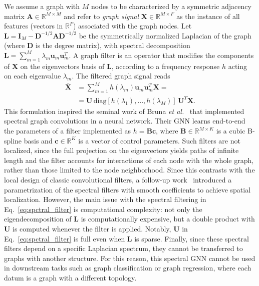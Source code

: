 \documentclass{article}
\def\X{{\mathbf X}}
\def\U{{\mathbf U}}
\def\A{{\mathbf A}}
\def\L{{\mathbf L}}
\def\D{{\mathbf D}}
\def\I{{\mathbf I}}
\def\L{{\mathbf L}}
\begin{document}
We assume a graph with $M$ nodes to be characterized by a symmetric adjacency matrix $\A \in \mathbb{R}^{M \times M}$ and refer to \textit{graph signal} $\X \in \mathbb{R}^{M \times F}$ as the instance of all features (vectors in $\mathbb{R}^F$) associated with the graph nodes.
Let $\L = \I_M - \D^{-1/2}\A\D^{-1/2}$ be the symmetrically normalized Laplacian of the graph (where $\D$ is the degree matrix), with spectral decomposition $\L = \sum_{m=1}^M \lambda_m \mathbf{u}_m \mathbf{u}^T_m$.
A graph filter is an operator that modifies the components of $\X$ on the eigenvectors basis of $\L$, according to a frequency response $h$ acting on each eigenvalue $\lambda_m$. 
The filtered graph signal reads
\begin{equation}
    \label{eq:spctral_filter}
    \begin{aligned}
    \bar{\X} & =  \sum_{m=1}^M h(\lambda_m) \mathbf{u}_m \mathbf{u}^T_m \X =\\
             & = \U \, \text{diag}[h(\lambda_1), \dots, h(\lambda_M)] \, \U^T \X.
    \end{aligned}
\end{equation}
This formulation inspired the seminal work of Bruna \emph{et al.}~\cite{bruna2013spectral} that implemented spectral graph convolutions in a neural network. 
Their GNN learns end-to-end the parameters of a filter implemented as $h = \mathbf{B}\mathbf{c}$, where $\mathbf{B} \in \mathbb{R}^{M \times K}$ is a cubic B-spline basis and $\mathbf{c} \in \mathbb{R}^K$ is a vector of control parameters. 
Such filters are not localized, since the full projection on the eigenvectors yields paths of infinite length and the filter accounts for interactions of each node with the whole graph, rather than those limited to the node neighborhood.
Since this contrasts with the local design of classic convolutional filters, a follow-up work~\cite{henaff2015deep} introduced a parametrization of the spectral filters with smooth coefficients to achieve spatial localization.
However, the main issue with the spectral filtering in Eq.~\eqref{eq:spctral_filter} is computational complexity: not only the eigendecomposition of $\L$ is computationally expensive, but a double product with $\U$ is computed whenever the filter is applied.
Notably, $\U$ in Eq.~\eqref{eq:spctral_filter} is full even when $\L$ is sparse. 
Finally, since these spectral filters depend on a specific Laplacian spectrum, they cannot be transferred to graphs with another structure. 
For this reason, this spectral GNN cannot be used in downstream tasks such as graph classification or graph regression, where each datum is a graph with a different topology.
\end{document}

